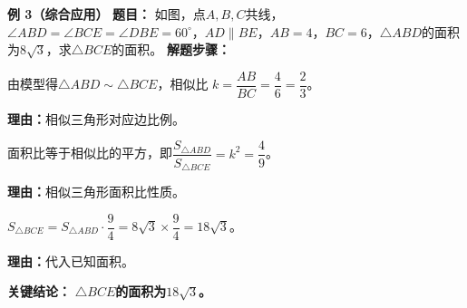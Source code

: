 \begin{examplebox}
	\medskip
	\textbf{\textcolor{CExample}{例 3（综合应用）}}
	\textbf{\textcolor{CExample}{题目：}}
	如图，点$A,B,C$共线，$\angle ABD=\angle BCE=\angle DBE=60^{\circ}$，$AD\parallel BE$，$AB=4$，$BC=6$，$\triangle ABD$的面积为$8\sqrt{3}$，求$\triangle BCE$的面积。
	\textbf{\textcolor{CExample}{解题步骤：}}
	\begin{description}[style=nextline, leftmargin=2.8em, labelsep=0.5em, itemsep=0.45em]
		\item[\textbf{第一步（求相似比）：}]
			由模型得$\triangle ABD\sim\triangle BCE$，相似比 $k=\dfrac{AB}{BC}=\dfrac{4}{6}=\dfrac{2}{3}$。
			\par\textbf{理由：}相似三角形对应边比例。
		\item[\textbf{第二步（面积比）：}]
			面积比等于相似比的平方，即$\dfrac{S_{\triangle ABD}}{S_{\triangle BCE}}=k^2=\dfrac{4}{9}$。
			\par\textbf{理由：}相似三角形面积比性质。
		\item[\textbf{第三步（计算面积）：}]
			$S_{\triangle BCE}=S_{\triangle ABD}\cdot\dfrac{9}{4}=8\sqrt{3}\times\dfrac{9}{4}=18\sqrt{3}$。
			\par\textbf{理由：}代入已知面积。
	\end{description}
	\textbf{\textcolor{CExample}{关键结论：}}
	\textbf{$\triangle BCE$的面积为$18\sqrt{3}$。}
\end{examplebox}
